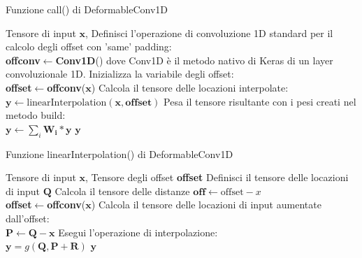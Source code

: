 \documentclass[12pt,a4paper]{report}
\begin{document}
    \begin{algorithm}[t] 
        \caption{Funzione call() di DeformableConv1D}
        \begin{algorithmic} \label{alg:defcall}
            \REQUIRE Tensore di input $\boldsymbol{x}$,
            \STATE Definisci l'operazione di convoluzione 1D standard per il calcolo
            degli offset con 'same' padding:\\
            \quad\textbf{offconv}$\gets$\textbf{Conv1D}() dove Conv1D \`e il metodo 
            nativo di Keras di un layer convoluzionale 1D.
            \STATE Inizializza la variabile degli offset:\\
            \quad\textbf{offset}$\gets$\textbf{offconv}($\boldsymbol{x}$)
            \STATE Calcola il tensore delle locazioni interpolate:\\
            \quad $\boldsymbol{y}\gets\text{linearInterpolation}(\boldsymbol{x}, 
            \textbf{offset})$
            \STATE Pesa il tensore risultante con i pesi creati nel metodo build:\\
            \quad$\boldsymbol{y}\gets\sum_i\boldsymbol{W_i}*\boldsymbol{y}$
            \RETURN $\boldsymbol{y}$
        \end{algorithmic}
    \end{algorithm}

    \begin{algorithm}[t] 
        \caption{Funzione linearInterpolation() di DeformableConv1D}
        \begin{algorithmic} \label{alg:deflinint}
            \REQUIRE Tensore di input $\boldsymbol{x}$, 
            Tensore degli offset \textbf{offset}
            \STATE Definisci il tensore delle locazioni di input $\boldsymbol{Q}$
            \STATE Calcola il tensore delle distanze $\textbf{off}\gets
            \text{offset}-x$\\
            \quad\textbf{offset}$\gets$\textbf{offconv}($\boldsymbol{x}$)
            \STATE Calcola il tensore delle locazioni di input aumentate 
            dall'offset:\\
            \quad $\boldsymbol{P}\gets\boldsymbol{Q}-\boldsymbol{x}$ 
            \STATE Esegui l'operazione di interpolazione:\\
            \quad$\boldsymbol{y}=g(\boldsymbol{Q}, \boldsymbol{P}+\boldsymbol{R})$
            \RETURN $\boldsymbol{y}$
        \end{algorithmic}
    \end{algorithm}
\end{document}
